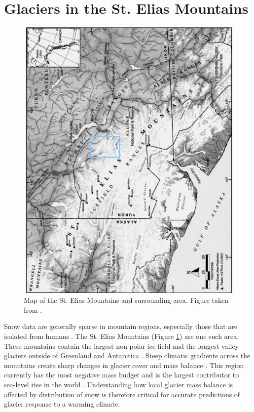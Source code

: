 \documentclass[12pt]{article}
\begin{document}
\section{Glaciers in the St. Elias Mountains}
\begin{figure}
 \centering
      \includegraphics[width=\textwidth]{stelias.png}
  \caption{Map of the St. Elias Mountains and surrounding area. Figure taken from \cite{Danby2003}.}
        \label{map}
\end{figure}

Snow data are generally sparse in mountain regions, especially those that are isolated from humans \citep{Marcus1970}. The St. Elias Mountains (Figure \ref{map}) are one such area. These mountains contain the largest non-polar ice field and the longest valley glaciers outside of Greenland and Antarctica \citep{Marcus1970, Danby2003}. Steep climatic gradients across the mountains create sharp changes in glacier cover and mass balance \citep{Clarke2002}. This region currently has the most negative mass budget and is the largest contributor to sea-level rise in the world \citep{Kaser2006, Gardner2013}. Understanding how local glacier mass balance is affected by distribution of snow is therefore critical for accurate predictions of glacier response to a warming climate. 
\end{document}
